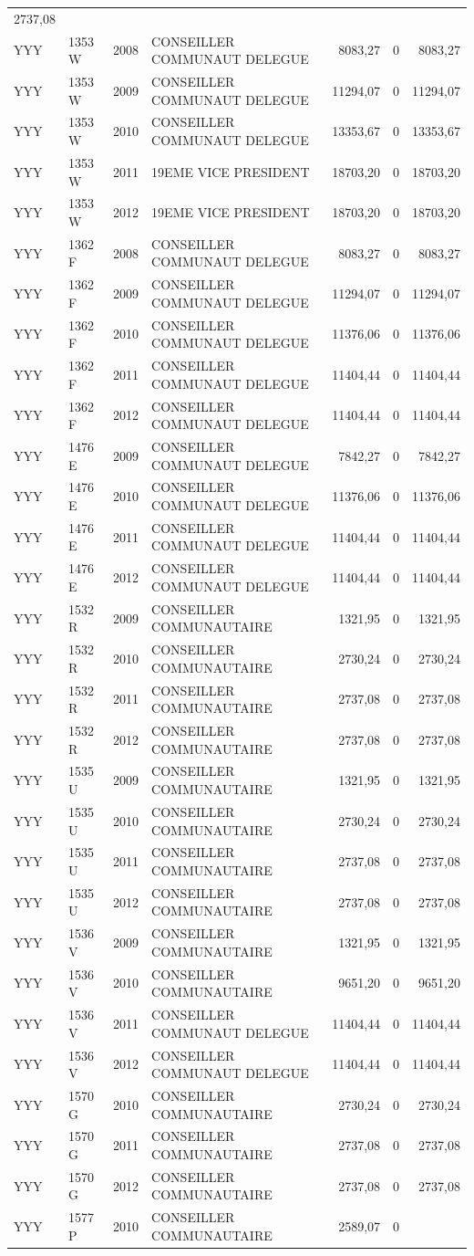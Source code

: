 \begin{longtable}[]{@{}llrlrrr@{}}
2737,08\tabularnewline
YYY & 1353 W & 2008 & CONSEILLER COMMUNAUT DELEGUE & 8083,27 & 0 &
8083,27\tabularnewline
YYY & 1353 W & 2009 & CONSEILLER COMMUNAUT DELEGUE & 11294,07 & 0 &
11294,07\tabularnewline
YYY & 1353 W & 2010 & CONSEILLER COMMUNAUT DELEGUE & 13353,67 & 0 &
13353,67\tabularnewline
YYY & 1353 W & 2011 & 19EME VICE PRESIDENT & 18703,20 & 0 &
18703,20\tabularnewline
YYY & 1353 W & 2012 & 19EME VICE PRESIDENT & 18703,20 & 0 &
18703,20\tabularnewline
YYY & 1362 F & 2008 & CONSEILLER COMMUNAUT DELEGUE & 8083,27 & 0 &
8083,27\tabularnewline
YYY & 1362 F & 2009 & CONSEILLER COMMUNAUT DELEGUE & 11294,07 & 0 &
11294,07\tabularnewline
YYY & 1362 F & 2010 & CONSEILLER COMMUNAUT DELEGUE & 11376,06 & 0 &
11376,06\tabularnewline
YYY & 1362 F & 2011 & CONSEILLER COMMUNAUT DELEGUE & 11404,44 & 0 &
11404,44\tabularnewline
YYY & 1362 F & 2012 & CONSEILLER COMMUNAUT DELEGUE & 11404,44 & 0 &
11404,44\tabularnewline
YYY & 1476 E & 2009 & CONSEILLER COMMUNAUT DELEGUE & 7842,27 & 0 &
7842,27\tabularnewline
YYY & 1476 E & 2010 & CONSEILLER COMMUNAUT DELEGUE & 11376,06 & 0 &
11376,06\tabularnewline
YYY & 1476 E & 2011 & CONSEILLER COMMUNAUT DELEGUE & 11404,44 & 0 &
11404,44\tabularnewline
YYY & 1476 E & 2012 & CONSEILLER COMMUNAUT DELEGUE & 11404,44 & 0 &
11404,44\tabularnewline
YYY & 1532 R & 2009 & CONSEILLER COMMUNAUTAIRE & 1321,95 & 0 &
1321,95\tabularnewline
YYY & 1532 R & 2010 & CONSEILLER COMMUNAUTAIRE & 2730,24 & 0 &
2730,24\tabularnewline
YYY & 1532 R & 2011 & CONSEILLER COMMUNAUTAIRE & 2737,08 & 0 &
2737,08\tabularnewline
YYY & 1532 R & 2012 & CONSEILLER COMMUNAUTAIRE & 2737,08 & 0 &
2737,08\tabularnewline
YYY & 1535 U & 2009 & CONSEILLER COMMUNAUTAIRE & 1321,95 & 0 &
1321,95\tabularnewline
YYY & 1535 U & 2010 & CONSEILLER COMMUNAUTAIRE & 2730,24 & 0 &
2730,24\tabularnewline
YYY & 1535 U & 2011 & CONSEILLER COMMUNAUTAIRE & 2737,08 & 0 &
2737,08\tabularnewline
YYY & 1535 U & 2012 & CONSEILLER COMMUNAUTAIRE & 2737,08 & 0 &
2737,08\tabularnewline
YYY & 1536 V & 2009 & CONSEILLER COMMUNAUTAIRE & 1321,95 & 0 &
1321,95\tabularnewline
YYY & 1536 V & 2010 & CONSEILLER COMMUNAUTAIRE & 9651,20 & 0 &
9651,20\tabularnewline
YYY & 1536 V & 2011 & CONSEILLER COMMUNAUT DELEGUE & 11404,44 & 0 &
11404,44\tabularnewline
YYY & 1536 V & 2012 & CONSEILLER COMMUNAUT DELEGUE & 11404,44 & 0 &
11404,44\tabularnewline
YYY & 1570 G & 2010 & CONSEILLER COMMUNAUTAIRE & 2730,24 & 0 &
2730,24\tabularnewline
YYY & 1570 G & 2011 & CONSEILLER COMMUNAUTAIRE & 2737,08 & 0 &
2737,08\tabularnewline
YYY & 1570 G & 2012 & CONSEILLER COMMUNAUTAIRE & 2737,08 & 0 &
2737,08\tabularnewline
YYY & 1577 P & 2010 & CONSEILLER COMMUNAUTAIRE & 2589,07 & 0 &

\end{longtable}

